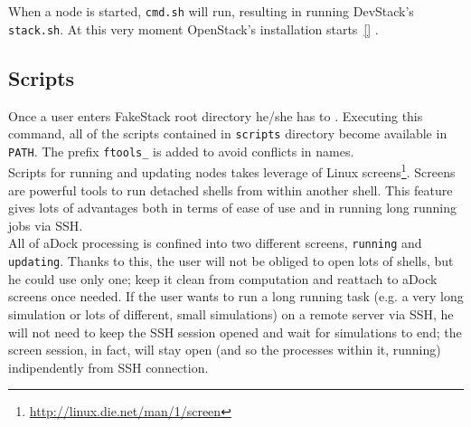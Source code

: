When a node is started, \texttt{cmd.sh} will run, resulting in running DevStack's \texttt{stack.sh}. At this very moment OpenStack's installation starts~\ref{} .

\subsection{Scripts}
\label{sub:fakestack_scripts}
Once a user enters FakeStack root directory he/she has to . Executing this command, all of the scripts contained in \texttt{scripts} directory become available in \texttt{PATH}. The prefix \texttt{ftools\_} is added to avoid conflicts in names.\\
Scripts for running and updating nodes takes leverage of Linux screens\footnote{\url{http://linux.die.net/man/1/screen}}. Screens are powerful tools to run detached shells from within another shell. This feature gives lots of advantages both in terms of ease of use and in running long running jobs via SSH.\\
All of aDock processing is confined into two different screens, \texttt{running} and \texttt{updating}. Thanks to this, the user will not be obliged to open lots of shells, but he could use only one; keep it clean from computation and reattach to aDock screens once needed. If the user wants to run a long running task (e.g. a very long simulation or lots of different, small simulations) on a remote server via SSH, he will not need to keep the SSH session opened and wait for simulations to end; the screen session, in fact, will stay open (and so the processes within it, running) indipendently from SSH connection. 

